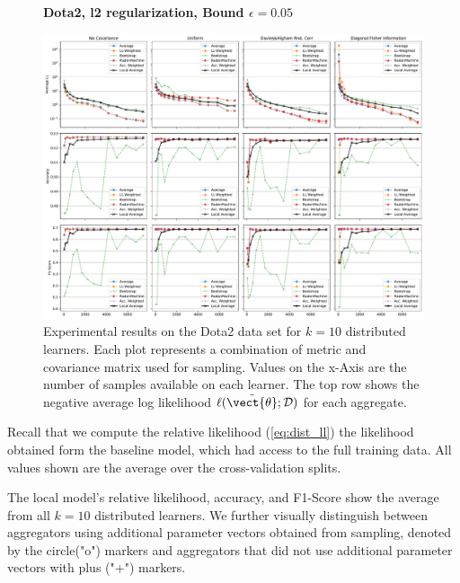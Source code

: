     \begin{landscape}
        \begin{figure}
            \centering
            \textbf{Dota2, l2 regularization, Bound $\epsilon=0.05$}\par\medskip
            \includegraphics[height=\dimexpr \textheight - 1\baselineskip\relax]{kapitel/figures/dota2_l2_0.05.pdf}
            \caption[Dota2 plots with l2 regularization and $\epsilon=0.05$]{Experimental results on the Dota2 data set for $k=10$ distributed learners. Each plot represents a combination of metric and covariance matrix used for sampling. Values on the x-Axis are the number of samples available on each learner. The top row shows the negative average log likelihood $\ell(\tilde{\vect{\theta}}; \mathcal{D})$ for each aggregate.}
            \label{fig:analysis3}
        \end{figure}
    \end{landscape}

Recall that we compute the relative likelihood (\autoref{eq:dist_ll}) \wrt the likelihood obtained form the baseline model, which had access to the full training data.
All values shown are the average over the cross-validation splits.

The local model's relative likelihood, accuracy, and F1-Score show the average from all $k=10$ distributed learners.
We further visually distinguish between aggregators using additional parameter vectors obtained from sampling, denoted by the circle("o") markers and aggregators that did not use additional parameter vectors with plus ("+") markers.

